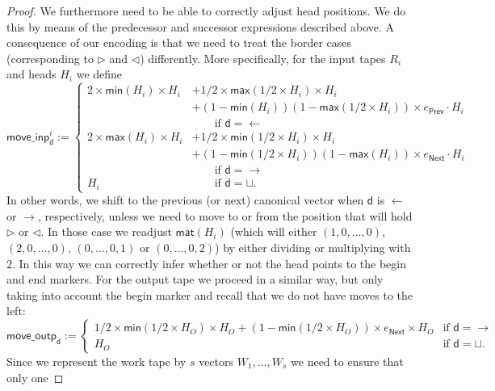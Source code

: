 \begin{proof}
    We furthermore need to be able to correctly adjust head positions. We do this by means of the predecessor 
    and successor expressions described above. 
    A consequence of our encoding is that we need to treat the border cases (corresponding to $\rhd$ and 
    $\lhd$) differently. More specifically, for the input tapes $R_i$ and heads $H_i$ we define 
    $$
    \mathsf{move\_inp}^i_{\mathsf{d}}:=
    \begin{cases}
    2\times \mathsf{min}(H_i)\times H_i & + 1/2\times\mathsf{max}(1/2\times H_i)\times H_i \\
    & +(1-\mathsf{min}(H_i))(1-\mathsf{max}(1/2 \times H_i))\times e_{\mathsf{Prev}}\cdot H_i  \\
    &\hspace{2em}\text{if $\mathsf{d}=\leftarrow$}\\
    2\times \mathsf{max}(H_i)\times H_i & + 1/2\times\mathsf{min}(1/2\times H_i)\times H_i \\
    & + (1-\mathsf{min}(1/2\times H_i))(1-\mathsf{max}(H_i))\times e_{\mathsf{Next}}\cdot H_i  \\
    &\hspace{2em}\text{if $\mathsf{d}=\rightarrow$}\\
    H_i & \hspace{2em}\text{if $\mathsf{d}=\sqcup$}. 
    \end{cases}
    $$
    In other words, we shift to the previous (or next) canonical vector when $\mathsf{d}$ is $\leftarrow$ 
    or $\rightarrow$, respectively, unless we need to move to or from the position that will hold $\rhd$ 
    or $\lhd$. In those case we readjust $\mathsf{mat}(H_i)$ (which will either $(1,0,\ldots,0)$, $(2,0,\ldots,0)$, 
    $(0,\ldots,0,1)$ or $(0,\ldots,0,2)$) by either dividing or multiplying with $2$. In this way we can 
    correctly infer whether or not the head points to the begin and end markers. For the output tape we 
    proceed in a similar way, but only taking into account the begin marker and recall that we do not have 
    moves to the left:
    $$
    \mathsf{move\_outp}_{\mathsf{d}}:=
    \begin{cases}
    1/2\times\mathsf{min}(1/2\times H_O)\times H_O  + (1-\mathsf{min}(1/2\times H_O))\times e_{\mathsf{Next}}\times H_O  
    & \text{if $\mathsf{d}=\rightarrow$}\\
    H_O & \text{if $\mathsf{d}=\sqcup$}. 
    \end{cases}
    $$
    Since we represent the work tape by $s$ vectors $W_1,\ldots,W_s$ we need to ensure that only one 

\end{proof}
